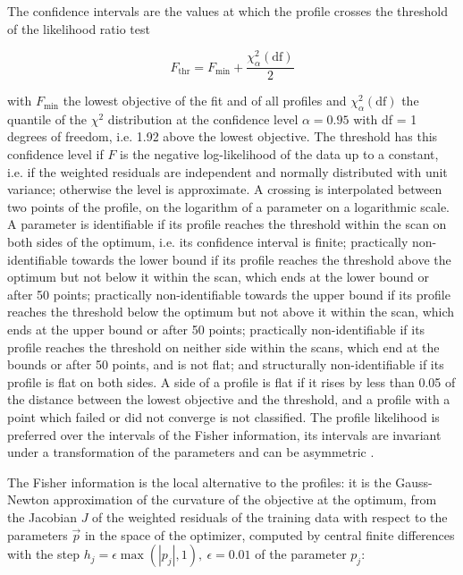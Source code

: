 The confidence intervals are the values at which the profile crosses the threshold of the likelihood ratio test

\begin{equation}
F_{\mathrm{thr}} = F_{\min} + \frac{\chi^2_{\alpha}(\mathrm{df})}{2}
\end{equation}

with $F_{\min}$ the lowest objective of the fit and of all profiles and $\chi^2_{\alpha}(\mathrm{df})$ the quantile of the $\chi^2$ distribution at the confidence level $\alpha = 0.95$ with df = 1 degrees of freedom, i.e. 1.92 above the lowest objective. The threshold has this confidence level if $F$ is the negative log-likelihood of the data up to a constant, i.e. if the weighted residuals are independent and normally distributed with unit variance; otherwise the level is approximate. A crossing is interpolated between two points of the profile, on the logarithm of a parameter on a logarithmic scale. A parameter is identifiable if its profile reaches the threshold within the scan on both sides of the optimum, i.e. its confidence interval is finite; practically non-identifiable towards the lower bound if its profile reaches the threshold above the optimum but not below it within the scan, which ends at the lower bound or after 50 points; practically non-identifiable towards the upper bound if its profile reaches the threshold below the optimum but not above it within the scan, which ends at the upper bound or after 50 points; practically non-identifiable if its profile reaches the threshold on neither side within the scans, which end at the bounds or after 50 points, and is not flat; and structurally non-identifiable if its profile is flat on both sides. A side of a profile is flat if it rises by less than 0.05 of the distance between the lowest objective and the threshold, and a profile with a point which failed or did not converge is not classified. The profile likelihood is preferred over the intervals of the Fisher information, its intervals are invariant under a transformation of the parameters and can be asymmetric \cite{Wieland2021}.

The Fisher information is the local alternative to the profiles: it is the Gauss-Newton approximation of the curvature of the objective at the optimum, from the Jacobian $J$ of the weighted residuals of the training data with respect to the parameters $\vec{p}$ in the space of the optimizer, computed by central finite differences with the step $h_j = \epsilon \max(|p_j|, 1),\ \epsilon = 0.01$ of the parameter $p_j$:

